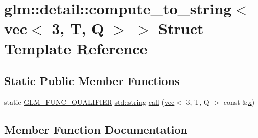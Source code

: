 \hypertarget{structglm_1_1detail_1_1compute__to__string_3_01vec_3_013_00_01_t_00_01_q_01_4_01_4}{}\section{glm\+:\+:detail\+:\+:compute\+\_\+to\+\_\+string$<$ vec$<$ 3, T, Q $>$ $>$ Struct Template Reference}
\label{structglm_1_1detail_1_1compute__to__string_3_01vec_3_013_00_01_t_00_01_q_01_4_01_4}
\subsection*{Static Public Member Functions}
\begin{DoxyCompactItemize}
\item 
static \hyperlink{setup_8hpp_a33fdea6f91c5f834105f7415e2a64407}{G\+L\+M\+\_\+\+F\+U\+N\+C\+\_\+\+Q\+U\+A\+L\+I\+F\+I\+ER} \hyperlink{_s_d_l__opengl__glext_8h_ae84541b4f3d8e1ea24ec0f466a8c568b}{std\+::string} \hyperlink{structglm_1_1detail_1_1compute__to__string_3_01vec_3_013_00_01_t_00_01_q_01_4_01_4_a61d57060d3b0c3f2dd672f7b8cf962a5}{call} (\hyperlink{structglm_1_1vec}{vec}$<$ 3, T, Q $>$ const \&\hyperlink{_s_d_l__opengl_8h_ad0e63d0edcdbd3d79554076bf309fd47}{x})
\end{DoxyCompactItemize}


\subsection{Member Function Documentation}
\mbox{\label{structglm_1_1detail_1_1compute__to__string_3_01vec_3_013_00_01_t_00_01_q_01_4_01_4_a61d57060d3b0c3f2dd672f7b8cf962a5}} 
